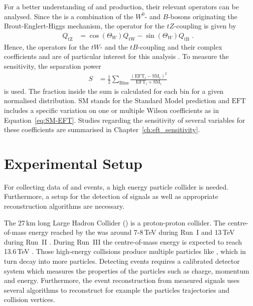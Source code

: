 \documentclass[bachelor,oneside, BCOR10mm,
			ngerman,english  %
]{GAUBM}
\begin{document}
For a better understanding of \ttbarZ and \ttbarW production, their relevant operators can be analysed. Since the \zboson is a combination of the $W^0$- and $B$-bosons originating the Brout-Englert-Higgs mechanism, the operator \optZ for the $tZ$-coupling is given by \cite{higgs_mechanism_1}
\begin{align}
	Q_\text{tZ} &= \cos(\Theta_W)Q_\text{tW} - \sin(\Theta_W)Q_\text{tB}\;.\label{eq:OparatortZ}
\end{align}
Hence, the operators for the $tW$- and the $tB$-coupling and their complex coefficients \ctW and \ctB are of particular interest for this analysis \cite{eft_operatorlist}. To measure the sensitivity, the separation power 
\begin{align}
	S &= \frac{1}{2}\sum_\text{Bins}\frac{\left(\text{EFT}_i-\text{SM}_i\right)^2}{\text{EFT}_i+\text{SM}_i}\label{eq:SeparationPower}
\end{align}
is used. The fraction inside the sum is calculated for each bin for a given normalised distribution. $\text{SM}$ stands for the Standard Model prediction and $\text{EFT}$ includes a specific variation on one or multiple Wilson coefficients as in Equation~\ref{eq:SM-EFT}. Studies regarding the sensitivity of several variables for these coefficients are summarised in Chapter~\ref{ch:eft_sensitivity}. 


\chapter{Experimental Setup}
\label{ch:experimental_setup}
For collecting data of \ttbarZ and \ttbarW events, a high energy particle collider is needed. Furthermore, a setup for the detection of signals as well as appropriate reconstruction algorithms are necessary.

The 27\,km long Large Hadron Collider (\lhc) is a proton-proton collider. The centre-of-mass energy reached by the \lhc was around 7-8\,TeV during Run~I and 13\,TeV during Run~II \cite{lhc2}. During Run~III the centre-of-mass energy is expected to reach 13.6\,TeV \cite{lhc_run3}. Those high-energy collisions produce multiple particles like \tquarks, which in turn decay into more particles. Detecting events requires a calibrated detector system which measures the properties of the particles such as charge, momentum and energy. Furthermore, the event reconstruction from measured signals uses several algorithms to reconstruct for example the particles trajectories and collision vertices.
\end{document}
